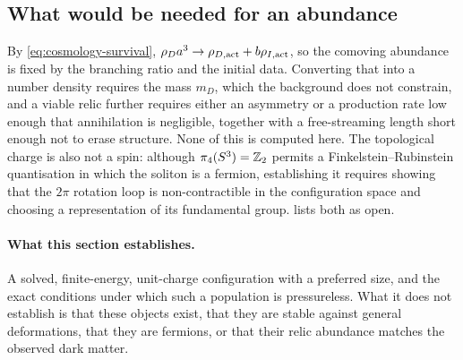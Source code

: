\subsection{What would be needed for an abundance}\label{sec:defects-abundance}

By \cref{eq:cosmology-survival}, $\rho_{D} a^3\to\rho_{D,\rm act}+b\rho_{I,\rm act}$,
so the comoving abundance is fixed by the branching ratio and the initial
data. Converting that into a number density requires the mass $m_D$, which the
background does not constrain, and a viable relic further requires either an
asymmetry or a production rate low enough that annihilation is negligible,
together with a free-streaming length short enough not to erase structure. None
of this is computed here. The topological charge is also not a spin: although
$\pi_4(S^3)=\mathbb{Z}_2$ permits a Finkelstein--Rubinstein quantisation in which the
soliton is a fermion, establishing it requires showing that the $2\pi$ rotation
loop is non-contractible in the configuration space and choosing a
representation of its fundamental group.  lists both as open.

\paragraph{What this section establishes.}
A solved, finite-energy, unit-charge configuration with a preferred size, and
the exact conditions under which such a population is pressureless. What it
does not establish is that these objects exist, that they are stable against
general deformations, that they are fermions, or that their relic abundance
matches the observed dark matter.
